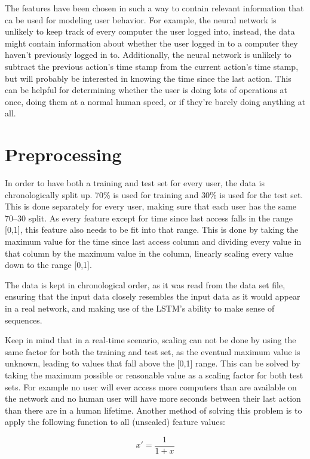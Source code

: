 The features have been chosen in such a way to contain relevant information that ca be used for modeling user behavior. For example, the neural network is unlikely to keep track of every computer the user logged into, instead, the data might contain information about whether the user logged in to a computer they haven't previously logged in to. Additionally, the neural network is unlikely to subtract the previous action's time stamp from the current action's time stamp, but will probably be interested in knowing the time since the last action. This can be helpful for determining whether the user is doing lots of operations at once, doing them at a normal human speed, or if they're barely doing anything at all.

\section{Preprocessing}
In order to have both a training and test set for every user, the data is chronologically split up. 70\% is used for training and 30\% is used for the test set. This is done separately for every user, making sure that each user has the same 70--30 split. As every feature except for time since last access falls in the range [0,1], this feature also needs to be fit into that range. This is done by taking the maximum value for the time since last access column and dividing every value in that column by the maximum value in the column, linearly scaling every value down to the range [0,1].

The data is kept in chronological order, as it was read from the data set file, ensuring that the input data closely resembles the input data as it would appear in a real network, and making use of the LSTM's ability to make sense of sequences.

Keep in mind that in a real-time scenario, scaling can not be done by using the same factor for both the training and test set, as the eventual maximum value is unknown, leading to values that fall above the [0,1] range. This can be solved by taking the maximum possible or reasonable value as a scaling factor for both test sets. For example no user will ever access more computers than are available on the network and no human user will have more seconds between their last action than there are in a human lifetime. Another method of solving this problem is to apply the following function to all (unscaled) feature values:

\begin{equation} \label{eq:normalize_2}
x' = \dfrac{1}{1+x}
\end{equation}

